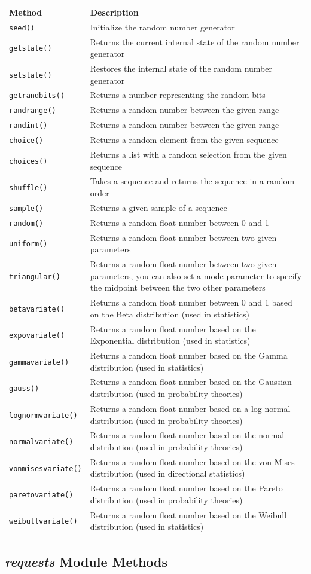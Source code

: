 \documentclass[12pt,a4paper]{article}
\newcommand{\lcode}[1]{%
	\lstinline{#1}%
}
\newcommand{\tcol}[2]{%
	\quad #1 & #2 \\
}
\begin{document}
\begin{center}
	\begin{longtable}{p{} p{}}
\tcol{\textbf{Method}}{\textbf{Description}}
\tcol{\lcode{seed()}}{Initialize the random number generator}
\tcol{\lcode{getstate()}}{Returns the current internal state of the random number generator}
\tcol{\lcode{setstate()}}{Restores the internal state of the random number generator}
\tcol{\lcode{getrandbits()}}{Returns a number representing the random bits}
\tcol{\lcode{randrange()}}{Returns a random number between the given range}
\tcol{\lcode{randint()}}{Returns a random number between the given range}
\tcol{\lcode{choice()}}{Returns a random element from the given sequence}
\tcol{\lcode{choices()}}{Returns a list with a random selection from the given sequence}
\tcol{\lcode{shuffle()}}{Takes a sequence and returns the sequence in a random order}
\tcol{\lcode{sample()}}{Returns a given sample of a sequence}
\tcol{\lcode{random()}}{Returns a random float number between 0 and 1}
\tcol{\lcode{uniform()}}{Returns a random float number between two given parameters}
\tcol{\lcode{triangular()}}{Returns a random float number between two given
		parameters, you can also set a mode parameter to specify the midpoint
		between the two other parameters}
\tcol{\lcode{betavariate()}}{Returns a random float number between 0 and 1
		based on the Beta distribution (used in statistics)}
\tcol{\lcode{expovariate()}}{Returns a random float number based on the
		Exponential distribution (used in statistics)}
\tcol{\lcode{gammavariate()}}{Returns a random float number based on the Gamma
		distribution (used in statistics)}
\tcol{\lcode{gauss()}}{Returns a random float number based on the Gaussian
		distribution (used in probability theories)}
\tcol{\lcode{lognormvariate()}}{Returns a random float number based on a
		log-normal distribution (used in probability theories)}
\tcol{\lcode{normalvariate()}}{Returns a random float number based on the
		normal distribution (used in probability theories)}
\tcol{\lcode{vonmisesvariate()}}{Returns a random float number based on the von
		Mises distribution (used in directional statistics)}
\tcol{\lcode{paretovariate()}}{Returns a random float number based on the
		Pareto distribution (used in probability theories)}
\tcol{\lcode{weibullvariate()}}{Returns a random float number based on the
		Weibull distribution (used in statistics)}
	\end{longtable}
\end{center}
\subsection{\textit{requests} Module Methods}\label{pyRequestsModuleMethod}
\end{document}
